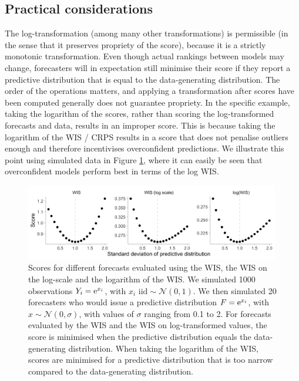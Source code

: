 \documentclass{article}
\begin{document}
\subsection{Practical considerations}
\label{sec:methods:considerations}

The log-transformation (among many other transformations) is permissible (in the sense that it preserves propriety of the score), because it is a strictly monotonic transformation. Even though actual rankings between models may change, forecasters will in expectation still minimise their score if they report a predictive distribution that is equal to the data-generating distribution. The order of the operations matters, and applying a transformation after scores have been computed generally does not guarantee propriety. In the specific example, taking the logarithm of the scores, rather than scoring the log-transformed forecasts and data, results in an improper score. This is because taking the logarithm of the WIS / CRPS results in a score that does not penalise outliers enough and therefore incentivises overconfident predictions. We illustrate this point using simulated data in Figure \ref{fig:log-improper}, where it can easily be seen that overconfident models perform best in terms of the log WIS. 

\begin{figure}[h!]
    \centering
    \includegraphics[width=0.99\textwidth]{output/figures/example-log-first.png}
    \caption{Scores for different forecasts evaluated using the WIS, the WIS on the log-scale and the logarithm of the WIS. We simulated 1000 observations $Y_i = {\rm e}^{x_i}$, with $x_i \text{ iid} \sim \mathcal{N}(0, 1)$. We then simulated 20 forecasters who would issue a predictive distribution $F = {\rm e}^{x_i}$, with $x \sim \mathcal{N}(0, \sigma)$, with values of $\sigma$ ranging from 0.1 to 2. For forecasts evaluated by the WIS and the WIS on log-transformed values, the score is minimised when the predictive distribution equals the data-generating distribution. When taking the logarithm of the WIS, scores are minimised for a predictive distribution that is too narrow compared to the data-generating distribution.}
    \label{fig:log-improper}
\end{figure}
\end{document}
